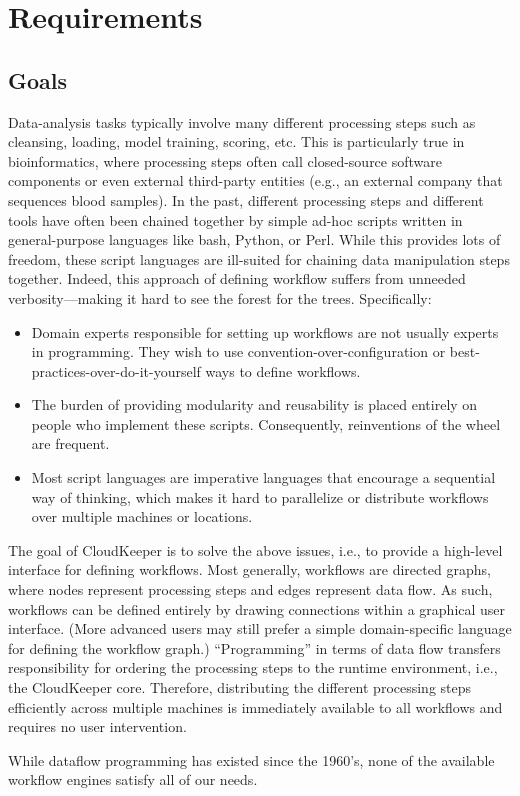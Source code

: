 
\chapter{Requirements}



\section{Goals}

Data-analysis tasks typically involve many different processing steps such as cleansing, loading, model training, scoring, etc. This is particularly true in bioinformatics, where processing steps often call closed-source software components or even external third-party entities (e.g., an external company that sequences blood samples). In the past, different processing steps and different tools have often been chained together by simple ad-hoc scripts written in general-purpose languages like bash, Python, or Perl. While this provides lots of freedom, these script languages are ill-suited for chaining data manipulation steps together. Indeed, this approach of defining workflow suffers from unneeded verbosity---making it hard to see the forest for the trees. Specifically:

\begin{itemize}
	\item Domain experts responsible for setting up workflows are not usually experts in programming. They wish to use convention-over-configuration or best-practices-over-do-it-yourself ways to define workflows.
	\item The burden of providing modularity and reusability is placed entirely on people who implement these scripts. Consequently, reinventions of the wheel are frequent.
	\item Most script languages are imperative languages that encourage a sequential way of thinking, which makes it hard to parallelize or distribute workflows over multiple machines or locations.
\end{itemize}

The goal of CloudKeeper is to solve the above issues, i.e., to provide a high-level interface for defining workflows. Most generally, workflows are directed graphs, where nodes represent processing steps and edges represent data flow. As such, workflows can be defined entirely by drawing connections within a graphical user interface. (More advanced users may still prefer a simple domain-specific language for defining the workflow graph.) ``Programming'' in terms of data flow transfers responsibility for ordering the processing steps to the runtime environment, i.e., the CloudKeeper core. Therefore, distributing the different processing steps efficiently across multiple machines is immediately available to all workflows and requires no user intervention.

While dataflow programming has existed since the 1960's, none of the available workflow engines satisfy all of our needs.